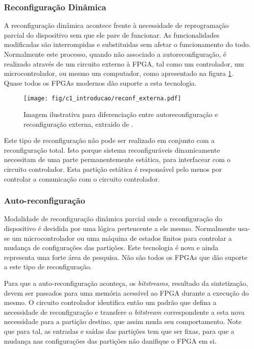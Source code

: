 \documentclass[11pt,a4paper,oneside]{book}
\begin{document}
\subsubsection{Reconfigura\c{c}\~ao Din\^amica}
\label{sss:dinamica}
A reconfigura\c{c}\~ao din\^amica acontece frente \`a necessidade de reprograma\c{c}\~ao parcial do dispositivo sem que ele pare de funcionar.
As funcionalidades modificadas s\~ao interrompidas e substituidas sem afetar o funcionamento do todo.
Normalmente este processo, quando n\~ao associado a autoreconfigura\c{c}\~ao, \'e realizado atrav\'es de um circuito externo à FPGA, tal como um controlador, um microcontrolador, ou mesmo um computador, como apresentado na figura \ref{fig:rexterna}.
Quase todos os FPGAs modernos d\~ao suporte a esta tecnologia.

\begin{figure}[h]
\centering
\texttt{[image: fig/c1\_introducao/reconf\_externa.pdf]}
\caption{Imagem ilustrativa para diferenciação entre autoreconfiguração e reconfiguração externa, extraido de \cite{wp374}.}
\label{fig:rexterna}
\end{figure}

Este tipo de reconfigura\c{c}\~ao n\~ao pode ser realizado em conjunto com a reconfigura\c{c}\~ao total.
Isto porque sistema reconfigur\'aveis dinamicamente necessitam de uma parte permanentemente est\'atica, para interfacear com o circuito controlador.
Esta parti\c{c}\~ao est\'atica \'e respons\'avel pelo menos por controlar a comunica\c{c}\~ao com o circuito controlador.

\subsubsection{Auto-reconfigura\c{c}\~ao}
Modalidade de reconfigura\c{c}\~ao din\^amica parcial onde a reconfigura\c{c}\~ao do dispositivo \'e decidida por uma l\'ogica pertencente a ele mesmo.
Normalmente usa-se um microcontrolador ou uma m\'aquina de estados finitos para controlar a mudan\c{c}a de configura\c{c}\~oes das parti\c{c}\~oes.
Este tecnologia \'e nova e ainda representa uma forte \'area de pesquisa.
N\~ao s\~ao todos os FPGAs que d\~ao suporte a este tipo de reconfigura\c{c}\~ao.

Para que a auto-reconfigura\c{c}\~ao aconte\c{c}a, os \textit{bitstreams}, resultado da sintetiza\c{c}\~ao, devem ser passados para uma mem\'oria acess\'i­vel ao FPGA durante a execu\c{c}\~ao do mesmo.
O circuito controlador identifica ent\~ao um padr\~ao que defina a necessidade de reconfigura\c{c}\~ao e transfere o \textit{bitstream} correspondente a esta nova necessidade para a parti\c{c}\~ao destino, que assim muda seu comportamento.
Note que para tal, as entradas e sa\'i­das das parti\c{c}\~oes tem que ser fixas, para que a mudan\c{c}a nas configura\c{c}\~oes das parti\c{c}\~oes n\~ao danifique o FPGA em si.
\end{document}
